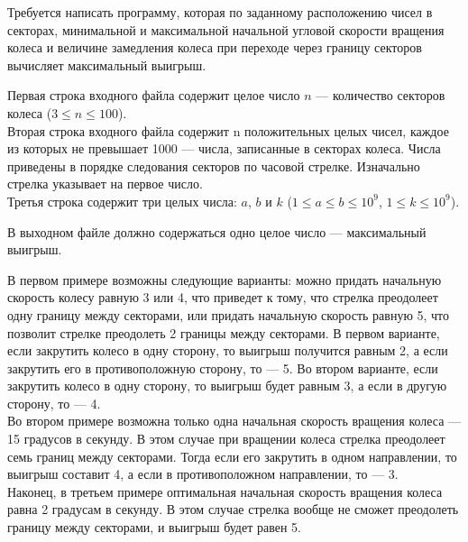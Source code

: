 \begin{problem}
Требуется написать программу, которая по заданному расположению чисел в секторах, минимальной и максимальной начальной угловой скорости вращения колеса и величине замедления колеса при переходе через границу секторов вычисляет максимальный выигрыш.

\InputFile

Первая строка входного файла содержит целое число $n$ — количество секторов колеса ($3 \le n \le 100$).\\

Вторая строка входного файла содержит n положительных целых чисел, каждое из которых не превышает 1000 — числа, записанные в секторах колеса. Числа приведены в порядке следования секторов по часовой стрелке. Изначально стрелка указывает на первое число.\\

Третья строка содержит три целых числа: $a$, $b$ и $k$ ($1 \le a \le b \le 10^9$, $1 \le k \le 10^9$).

\OutputFile

В выходном файле должно содержаться одно целое число — максимальный выигрыш.

\Examples

\begin{example}
%
%
%
\end{example}

\Explanation

В первом примере возможны следующие варианты: можно придать начальную скорость колесу равную 3 или 4, что приведет к тому, что стрелка преодолеет одну границу между секторами, или придать начальную скорость равную 5, что позволит стрелке преодолеть 2 границы между секторами. В первом варианте, если закрутить колесо в одну сторону, то выигрыш получится равным 2, а если закрутить его в противоположную сторону, то — 5. Во втором варианте, если закрутить колесо в одну сторону, то выигрыш будет равным 3, а если в другую сторону, то — 4.\\

Во втором примере возможна только одна начальная скорость вращения колеса — 15 градусов в секунду. В этом случае при вращении колеса стрелка преодолеет семь границ между секторами. Тогда если его закрутить в одном направлении, то выигрыш составит 4, а если в противоположном направлении, то — 3.\\

Наконец, в третьем примере оптимальная начальная скорость вращения колеса равна 2 градусам в секунду. В этом случае стрелка вообще не сможет преодолеть границу между секторами, и выигрыш будет равен 5.

\end{problem}